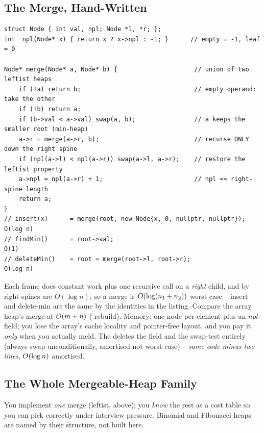 \subsection{The Merge, Hand-Written}

\begin{lstlisting}[caption={Leftist-heap merge: recurse down the right spine, then swap to restore leftness}, label={lst:c07-leftist}]
struct Node { int val, npl; Node *l, *r; };
int  npl(Node* x) { return x ? x->npl : -1; }      // empty = -1, leaf = 0

Node* merge(Node* a, Node* b) {                     // union of two leftist heaps
    if (!a) return b;                               // empty operand: take the other
    if (!b) return a;
    if (b->val < a->val) swap(a, b);                // a keeps the smaller root (min-heap)
    a->r = merge(a->r, b);                          // recurse ONLY down the right spine
    if (npl(a->l) < npl(a->r)) swap(a->l, a->r);    // restore the leftist property
    a->npl = npl(a->r) + 1;                         // npl == right-spine length
    return a;
}
// insert(x)      = merge(root, new Node{x, 0, nullptr, nullptr});   O(log n)
// findMin()      = root->val;                                       O(1)
// deleteMin()    = root = merge(root->l, root->r);                  O(log n)
\end{lstlisting}

\begin{complexitybox}
Each  frame does constant work plus one recursive call on a \emph{right} child, and by
 right spines are $O(\log n)$, so a merge is $O(\log(n_1+n_2))$ worst case --
insert and delete-min are the same by the identities in the listing. Compare the array heap's merge at
$O(m+n)$ ( rebuild). Memory: one node per element plus an $\mathit{npl}$ field; you
lose the array's cache locality and pointer-free layout, and you pay it \emph{only} when you actually meld.
The  deletes the  field and the swap-test entirely (always swap unconditionally,
amortised not worst-case) -- \emph{same code minus two lines}, $O(\log n)$ amortised.
\end{complexitybox}

\subsection{The Whole Mergeable-Heap Family}

You implement \emph{one} merge (leftist, above); you \emph{know} the rest as a cost table so you can pick
correctly under interview pressure. Binomial and Fibonacci heaps are named by their structure, not built
here.

